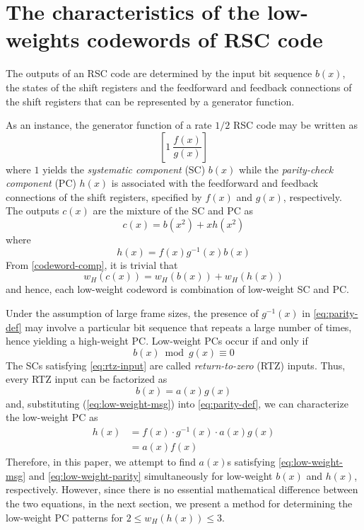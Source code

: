 \section{The characteristics of the low-weights codewords of RSC code}
\label{sec2}
The outputs of an RSC code are determined by the input bit sequence $b(x)$, the states of the shift registers and the feedforward and feedback connections of the shift registers that can be represented by a generator function. 

As an instance,  the generator function of a rate $1/2$ RSC code may be written as  $$\left[1 ~\frac{f(x)}{g(x)}\right]$$ where $1$ yields the \textit{systematic  component} (SC) $b(x)$ while the \textit{parity-check component} (PC) $h(x)$ is associated with the feedforward and feedback connections of the shift registers, specified by $f(x)$ and $g(x)$, respectively. The outputs $c(x)$ are the mixture of the SC and PC as
\begin{equation}
c(x) = b(x^2)+xh(x^2)
\label{codeword-comp}
\end{equation}
where 
\begin{equation}
h(x) =f(x)g^{-1}(x)b(x)
\label{eq:parity-def}
\end{equation}
From \eqref{codeword-comp}, it is trivial that
\begin{equation}
w_H(c(x))=w_H(b(x)) + w_H(h(x))
\label{eq:cw-weight}
\end{equation}
and hence, each low-weight codeword is combination of low-weight SC and PC.

Under the assumption of large frame sizes, the presence of $g^{-1}(x)$  in \eqref{eq:parity-def} may involve a particular bit sequence that repeats a large number of times, hence yielding a high-weight PC. Low-weight PCs occur if and only if
\begin{equation}
b(x) \bmod g(x) \equiv 0
\label{eq:rtz-input}
\end{equation}
The SCs satisfying \eqref{eq:rtz-input} are called \textit{return-to-zero} (RTZ) inputs. Thus, every RTZ input can be factorized as  
\begin{equation}
b(x) =a(x)g(x)
\label{eq:low-weight-msg}
\end{equation}
and, substituting (\ref{eq:low-weight-msg}) into \eqref{eq:parity-def}, we can characterize the low-weight PC as
\begin{equation}
\begin{split}
h(x)&=f(x)\cdot g^{-1}(x)\cdot a(x)g(x)\\
&=a(x)f(x)
\end{split}
\label{eq:low-weight-parity}
\end{equation}
Therefore, in this paper, we attempt to find $a(x)$s satisfying  \eqref{eq:low-weight-msg} and  \eqref{eq:low-weight-parity} simultaneously for low-weight $b(x)$ and $h(x)$, respectively. 
%
However, since there is no essential mathematical difference between the two equations, in the next section, we present a method for determining the low-weight PC patterns for $2 \leq w_H(h(x)) \leq 3$.


